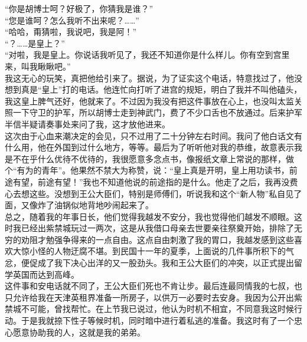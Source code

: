 “你是胡博士呵？好极了，你猜我是谁？”\\

“您是谁呵？怎么我听不出来呢？……”\\

“哈哈，甭猜啦，我说吧，我是阿！”\\

“？……是皇上？”\\

“对啦，我是皇上。你说话我听见了，我还不知道你是什么样儿。你有空到宫里来，叫我瞅瞅吧。”\\

我这无心的玩笑，真把他给引来了。据说，为了证实这个电话，特意找过了，他没想到真是“皇上”打的电话。他连忙向打听了进宫的规矩，明白了我并不叫他磕头，我这皇上脾气还好，他就来了。不过因为我没有把这件事放在心上，也没叫太监关照一下守卫的护军，所以胡博士走到神武门，费了不少口舌也不放通过。后来护军半信半疑请奏事处来问了我，这才放他进来。\\

这次由于心血来潮决定的会见，只不过用了二十分钟左右时间。我问了他白话文有什么用，他在外国到过什么地方，等等。最后为了听听他对我的恭维，故意表示我是不在乎什么优待不优待的，我很愿意多念点书，像报纸文章上常说的那样，做个“有为的青年”。他果然不禁大为称赞，说：“皇上真是开明，皇上用功读书，前途有望，前途有望！”我也不知道他说的前途指的是什么。他走了之后，我再没费心去想这些。没想到王公大臣们，特别是师傅们，听说我和这个“新人物”私自见了面，又像炸了油锅似地背地吵闹起来了。\\

总之，随着我的年事日长，他们觉得我越发不安分，我也觉得他们越发不顺眼。这时我已经出紫禁城玩过一两次，这是从我借口母亲去世要亲往祭奠开始，排除了无穷的劝阻才勉强争得来的一点自由。这点自由刺激了我的胃口，我越发感到这些喜欢大惊小怪的人物迂腐不堪。到民国十一年的夏季，上面说的几件事所积下的气忿，便促成了我下决心出洋的又一股劲头。我和王公大臣们的冲突，以正式提出留学英国而达到高峰。\\

这件事和安电话就不同了，王公大臣们死也不肯让步。最后连最同情我的七叔，也只允许给我在天津英租界准备一所房子，以供万一必要时去安身。我因为公开出紫禁城不可能，曾找帮忙。在上节我已说过，他认为时机不相宜，不同意我这时候行动。于是我就捺下性子等候时机，同时暗中进行着私逃的准备。我这时有了一个忠心愿意协助我的人，这就是我的弟弟。\\

